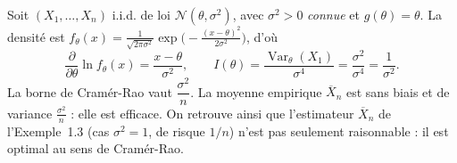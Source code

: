 \begin{exemple}
Soit $(X_1, \dots, X_n)$ i.i.d. de loi $\mathcal{N}(\theta, \sigma^{2})$, avec
$\sigma^{2} > 0$ \emph{connue} et $g(\theta) = \theta$. La densité est
$f_\theta(x) = \frac{1}{\sqrt{2\pi\sigma^{2}}}\exp\!\bigl(-\frac{(x-\theta)^{2}}{2\sigma^{2}}\bigr)$,
d'où
\[
  \frac{\partial}{\partial\theta} \ln f_\theta(x) = \frac{x - \theta}{\sigma^{2}},
  \qquad
  I(\theta) = \frac{\operatorname{Var}_\theta(X_1)}{\sigma^{4}}
  = \frac{\sigma^{2}}{\sigma^{4}} = \frac{1}{\sigma^{2}}.
\]
La borne de Cramér-Rao vaut $\dfrac{\sigma^{2}}{n}$. La moyenne empirique
$\overline{X}_n$ est sans biais et de variance $\frac{\sigma^{2}}{n}$ : elle est
efficace. On retrouve ainsi que l'estimateur $\overline{X}_n$ de l'Exemple~1.3
(cas $\sigma^{2} = 1$, de risque $1/n$) n'est pas seulement raisonnable : il est
optimal au sens de Cramér-Rao.
\end{exemple}